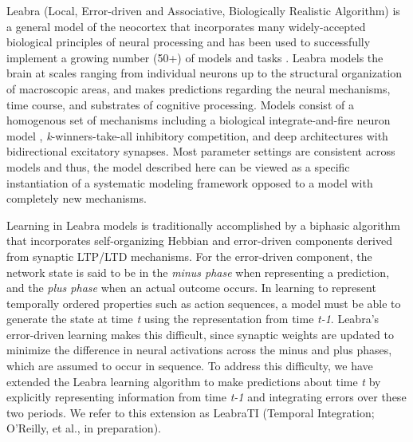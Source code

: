 \documentclass[10pt,letterpaper]{article}
\numberwithin{equation}{section}
\begin{document}
Leabra (Local, Error-driven and Associative, Biologically Realistic Algorithm) is a general model of the neocortex that incorporates many widely-accepted biological principles of neural processing and has been used to successfully implement a growing number (50+) of models and tasks \cite{OReilly:2000,OReilly:book}. Leabra models the brain at scales ranging from individual neurons up to the structural organization of macroscopic areas, and makes predictions regarding the neural mechanisms, time course, and substrates of cognitive processing. Models consist of a homogenous set of mechanisms including a biological integrate-and-fire neuron model \cite{Brette:2005}, \textit{k}-winners-take-all inhibitory competition, and deep architectures with bidirectional excitatory synapses. Most parameter settings are consistent across models and thus, the model described here can be viewed as a specific instantiation of a systematic modeling framework opposed to a model with completely new mechanisms.


Learning in Leabra models is traditionally accomplished by a biphasic algorithm that incorporates self-organizing Hebbian and error-driven components derived from synaptic LTP/LTD mechanisms. For the error-driven component, the network state is said to be in the \emph{minus phase} when representing a prediction, and the \emph{plus phase} when an actual outcome occurs. In learning to represent temporally ordered properties such as action sequences, a model must be able to generate the state at time \textit{t} using the representation from time \textit{t-1}. Leabra's error-driven learning makes this difficult, since synaptic weights are updated to minimize the difference in neural activations across the minus and plus phases, which are assumed to occur in sequence. To address this difficulty, we have extended the Leabra learning algorithm to make predictions about time \textit{t} by explicitly representing information from time \textit{t-1} and integrating errors over these two periods. We refer to this extension as LeabraTI (Temporal Integration; O'Reilly, et al., in preparation).

\end{document}
